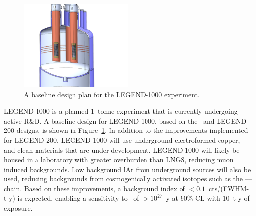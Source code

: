 \documentclass[/main.tex]{subfiles}
\begin{document}
\begin{figure}
  \centering
  \includegraphics[width=0.5\textwidth]{legend1000}
  \caption[Legend-1000 experimental design]{\label{legend1000}
    A baseline design plan for the LEGEND-1000 experiment.
  }
\end{figure}
LEGEND-1000 is a planned 1~tonne experiment that is currently undergoing active R\&D.
A baseline design for LEGEND-1000, based on the \Gerda\ and LEGEND-200 designs, is shown in Figure~\ref{legend1000}.
In addition to the improvements implemented for LEGEND-200, LEGEND-1000 will use underground electroformed copper, and clean materials that are under development.
LEGEND-1000 will likely be housed in a laboratory with greater overburden than LNGS, reducing muon induced backgrounds.
Low background lAr from underground sources will also be used, reducing backgrounds from cosmogenically activated isotopes such as the ---- chain.
Based on these improvements, a background index of $<0.1$~cts/(FWHM-t-y) is expected, enabling a sensitivity to  \znbb\ of $>10^{27}$~y at 90\% CL with 10~t-y of exposure.

\onlyinsubfile{
  
  
}
\end{document}
